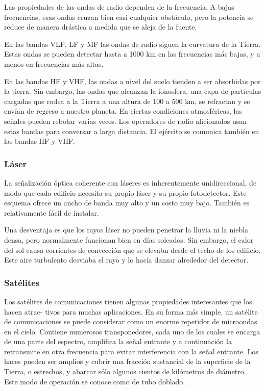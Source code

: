Las propiedades de las ondas de radio dependen de la frecuencia. A bajas frecuencias, esas ondas cruzan bien casi cualquier obstáculo, pero la potencia se reduce de manera drástica a medida que se aleja de la fuente.

En las bandas VLF, LF y MF las ondas de radio siguen la curvatura de la Tierra. Estas ondas se pueden detectar hasta a 1000 km en las frecuencias más bajas, y a menos en frecuencias más altas.

En las bandas HF y VHF, las ondas a nivel del suelo tienden a ser absorbidas por la tierra. Sin
embargo, las ondas que alcanzan la ionosfera, una capa de partículas cargadas que rodea a la Tierra a una altura de 100 a 500 km, se refractan y se envían de regreso a nuestro planeta. En ciertas condiciones atmosféricas, las señales pueden rebotar varias veces. Los operadores de radio aficionados usan estas bandas para conversar a larga distancia.
El ejército se comunica también en las bandas HF y VHF.

\subsubsection*{Láser}
La señalización óptica coherente con láseres es inherentemente unidireccional, de modo que cada edificio necesita su propio láser y su propio fotodetector. Este esquema ofrece un ancho de banda muy alto y un costo muy bajo. También es relativamente fácil de instalar.

Una desventaja es que los rayos láser no pueden penetrar la lluvia ni la niebla densa, pero normalmente funcionan bien en días soleados. Sin embargo, el calor del sol causa corrientes de convección que se elevabn desde el techo de los edificio. Este aire turbulento desviaba el rayo y lo hacía danzar alrededor del detector.

\subsubsection*{Satélites}
Los satélites de comunicaciones tienen algunas propiedades interesantes que los hacen atrac-
tivos para muchas aplicaciones. En su forma más simple, un satélite de comunicaciones se puede
considerar como un enorme repetidor de microondas en el cielo. Contiene numerosos transponedores, cada uno de los cuales se encarga de una parte del espectro, amplifica la señal entrante
y a continuación la retransmite en otra frecuencia para evitar interferencia con la señal entrante.
Los haces pueden ser amplios y cubrir una fracción sustancial de la superficie de la Tierra, o estrechos, y abarcar sólo algunos cientos de kilómetros de diámetro. Este modo de operación se
conoce como de tubo doblado.


